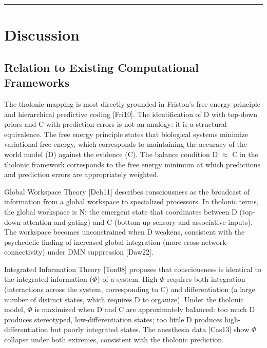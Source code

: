 \documentclass[12pt]{article}
\begin{document}
\begin{center}\rule{0.5\linewidth}{0.5pt}\end{center}

\section{Discussion}\label{discussion}

\subsection{Relation to Existing Computational Frameworks}\label{relation-to-existing-computational-frameworks}

The tholonic mapping is most directly grounded in Friston's free energy
principle and hierarchical predictive coding {[}Fri10{]}. The
identification of D with top-down priors and C with prediction errors is
not an analogy: it is a structural equivalence. The free energy
principle states that biological systems minimize variational free
energy, which corresponds to maintaining the accuracy of the world model
(D) against the evidence (C). The balance condition D \(\approx\) C in
the tholonic framework corresponds to the free energy minimum at which
predictions and prediction errors are appropriately weighted.

Global Workspace Theory {[}Deh11{]} describes consciousness as the
broadcast of information from a global workspace to specialized
processors. In tholonic terms, the global workspace is N: the emergent
state that coordinates between D (top-down attention and gating) and C
(bottom-up sensory and associative inputs). The workspace becomes
unconstrained when D weakens, consistent with the psychedelic finding of
increased global integration (more cross-network connectivity) under DMN
suppression {[}Daw22{]}.

Integrated Information Theory {[}Ton08{]} proposes that consciousness is
identical to the integrated information (\(\Phi\)) of a system. High
\(\Phi\) requires both integration (interactions across the system,
corresponding to C) and differentiation (a large number of distinct
states, which requires D to organize). Under the tholonic model,
\(\Phi\) is maximized when D and C are approximately balanced: too much
D produces stereotyped, low-differentiation states; too little D
produces high-differentiation but poorly integrated states. The
anesthesia data {[}Cas13{]} show \(\Phi\) collapse under both extremes,
consistent with the tholonic prediction.
\end{document}
